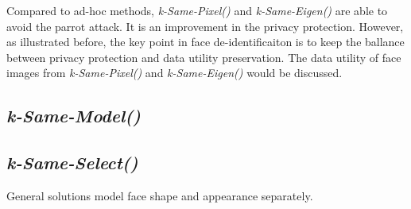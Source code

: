 	Compared to ad-hoc methods, \emph{k-Same-Pixel()} and \emph{k-Same-Eigen()} are able to avoid the parrot attack. It is an improvement in the privacy protection. However, as illustrated before, the key point in face de-identificaiton is to keep the ballance between privacy protection and data utility preservation. The data utility of face images from \emph{k-Same-Pixel()} and \emph{k-Same-Eigen()} would be discussed. 
 	\subsection{\emph{k-Same-Model()}}

	\subsection{\emph{k-Same-Select()}}
	
	General solutions model face shape and appearance separately. 